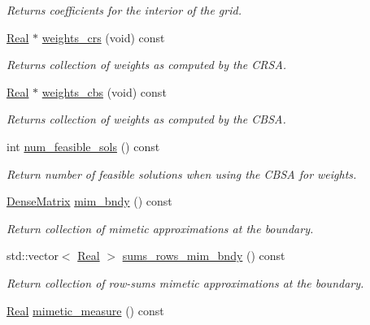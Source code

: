 \begin{DoxyCompactItemize}
\begin{DoxyCompactList}\small\item\em Returns coefficients for the interior of the grid. \end{DoxyCompactList}\item 
\hyperlink{group__c01-roots_gac080bbbf5cbb5502c9f00405f894857d}{Real} $\ast$ \hyperlink{classmtk_1_1Grad1D_ae5f15d8986a5680b6a1c120283c6cc5e}{weights\+\_\+crs} (void) const 
\begin{DoxyCompactList}\small\item\em Returns collection of weights as computed by the C\+R\+S\+A. \end{DoxyCompactList}\item 
\hyperlink{group__c01-roots_gac080bbbf5cbb5502c9f00405f894857d}{Real} $\ast$ \hyperlink{classmtk_1_1Grad1D_ad11927d8f9f1ca0089aaa2be7094f7f3}{weights\+\_\+cbs} (void) const 
\begin{DoxyCompactList}\small\item\em Returns collection of weights as computed by the C\+B\+S\+A. \end{DoxyCompactList}\item 
int \hyperlink{classmtk_1_1Grad1D_a3ee5504c8fedaae9e58f00d3698f7986}{num\+\_\+feasible\+\_\+sols} () const 
\begin{DoxyCompactList}\small\item\em Return number of feasible solutions when using the C\+B\+S\+A for weights. \end{DoxyCompactList}\item 
\hyperlink{classmtk_1_1DenseMatrix}{Dense\+Matrix} \hyperlink{classmtk_1_1Grad1D_ab25e1d064a5a00fbe3777e65fd5750c0}{mim\+\_\+bndy} () const 
\begin{DoxyCompactList}\small\item\em Return collection of mimetic approximations at the boundary. \end{DoxyCompactList}\item 
std\+::vector$<$ \hyperlink{group__c01-roots_gac080bbbf5cbb5502c9f00405f894857d}{Real} $>$ \hyperlink{classmtk_1_1Grad1D_ab1c580e5e7f6fad9a0f643b48d3e0e55}{sums\+\_\+rows\+\_\+mim\+\_\+bndy} () const 
\begin{DoxyCompactList}\small\item\em Return collection of row-\/sums mimetic approximations at the boundary. \end{DoxyCompactList}\item 
\hyperlink{group__c01-roots_gac080bbbf5cbb5502c9f00405f894857d}{Real} \hyperlink{classmtk_1_1Grad1D_a66bb2a8e60e685a0be897548ade3a6d6}{mimetic\+\_\+measure} () const 

\end{DoxyCompactItemize}
